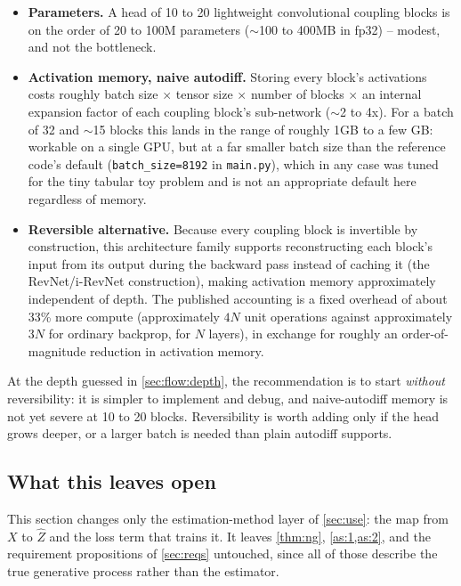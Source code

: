 \begin{itemize}[leftmargin=1.5em]
\item \textbf{Parameters.} A head of 10 to 20 lightweight convolutional coupling blocks is on the order
      of 20 to 100M parameters ($\sim$100 to 400MB in fp32) -- modest, and not the bottleneck.
\item \textbf{Activation memory, naive autodiff.} Storing every block's activations costs roughly
      batch size $\times$ tensor size $\times$ number of blocks $\times$ an internal expansion factor of
      each coupling block's sub-network ($\sim$2 to 4x). For a batch of 32 and $\sim$15 blocks this lands
      in the range of roughly 1GB to a few GB: workable on a single GPU, but at a far smaller batch size
      than the reference code's default (\texttt{batch\_size=8192} in \texttt{main.py}), which in any
      case was tuned for the tiny tabular toy problem and is not an appropriate default here regardless
      of memory.
\item \textbf{Reversible alternative.} Because every coupling block is invertible by construction, this
      architecture family supports reconstructing each block's input from its output during the backward
      pass instead of caching it (the RevNet/i-RevNet construction), making activation memory
      approximately independent of depth. The published accounting \cite{gomez2017} is a fixed overhead
      of about 33\% more compute (approximately $4N$ unit operations against approximately $3N$ for
      ordinary backprop, for $N$ layers), in exchange for roughly an order-of-magnitude reduction in
      activation memory.
\end{itemize}
At the depth guessed in \cref{sec:flow:depth}, the recommendation is to start \emph{without}
reversibility: it is simpler to implement and debug, and naive-autodiff memory is not yet severe at 10 to
20 blocks. Reversibility is worth adding only if the head grows deeper, or a larger batch is needed than
plain autodiff supports.

\subsection{What this leaves open}
\label{sec:flow:summary}
This section changes only the estimation-method layer of \cref{sec:use}: the map from $X$ to $\hat Z$ and
the loss term that trains it. It leaves \cref{thm:ng}, \cref{as:1,as:2}, and the requirement propositions
of \cref{sec:reqs} untouched, since all of those describe the true generative process rather than the
estimator.

